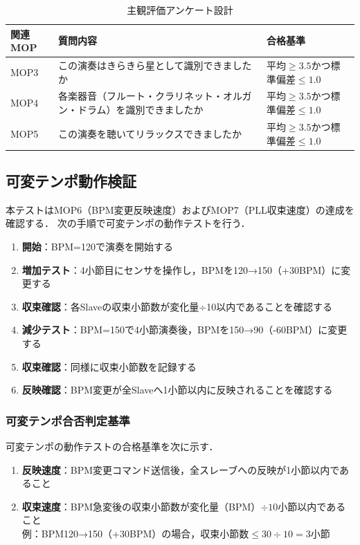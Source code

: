 \documentclass[lualatex,book,paper=a4paper,jafontsize=11.5pt,jafontscale=1.05]{jlreq}
\begin{document}
\begin{table}[htbp]
\centering
\begin{tabular}{L{1.5cm}L{8cm}L{4cm}}
  \toprule
  \textbf{関連MOP} & \textbf{質問内容} & \textbf{合格基準} \\
  \midrule
  MOP3 & この演奏はきらきら星として識別できましたか & 平均$\geq 3.5$かつ標準偏差$\leq 1.0$ \\
  MOP4 & 各楽器音（フルート・クラリネット・オルガン・ドラム）を識別できましたか & 平均$\geq 3.5$かつ標準偏差$\leq 1.0$ \\
  MOP5 & この演奏を聴いてリラックスできましたか & 平均$\geq 3.5$かつ標準偏差$\leq 1.0$ \\
  \bottomrule
\end{tabular}
\caption{主観評価アンケート設計}
\label{tab:questionnaire}
\end{table}

\subsection{可変テンポ動作検証}
本テストはMOP6（BPM変更反映速度）およびMOP7（PLL収束速度）の達成を確認する．
次の手順で可変テンポの動作テストを行う．

\begin{enumerate}
  \item \textbf{開始}：BPM=120で演奏を開始する
  \item \textbf{増加テスト}：4小節目にセンサを操作し，BPMを120→150（+30BPM）に変更する
  \item \textbf{収束確認}：各Slaveの収束小節数が変化量÷10以内であることを確認する
  \item \textbf{減少テスト}：BPM=150で4小節演奏後，BPMを150→90（-60BPM）に変更する
  \item \textbf{収束確認}：同様に収束小節数を記録する
  \item \textbf{反映確認}：BPM変更が全Slaveへ1小節以内に反映されることを確認する
\end{enumerate}

\subsubsection{可変テンポ合否判定基準}
可変テンポの動作テストの合格基準を次に示す．

\begin{enumerate}
  \item \textbf{反映速度}：BPM変更コマンド送信後，全スレーブへの反映が1小節以内であること
  \item \textbf{収束速度}：BPM急変後の収束小節数が変化量（BPM）$\div 10$小節以内であること \\
  例：BPM120→150（+30BPM）の場合，収束小節数$\leq 30 \div 10 = 3$小節
\end{enumerate}
\end{document}
